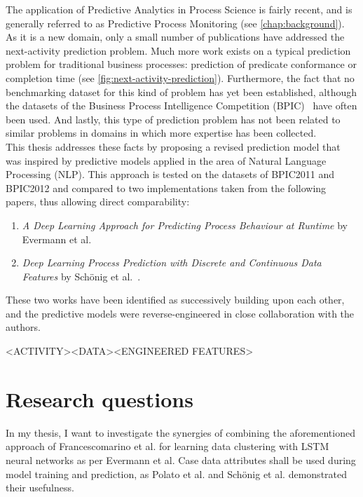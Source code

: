The application of Predictive Analytics in Process Science is fairly recent, and is generally referred to as Predictive Process Monitoring (see \autoref{chap:background}). As it is a new domain, only a small number of publications have addressed the next-activity prediction problem. Much more work exists on a typical prediction problem for traditional business processes: prediction of predicate conformance or completion time (see \autoref{fig:next-activity-prediction}). Furthermore, the fact that no benchmarking dataset for this kind of problem has yet been established, although the datasets of the Business Process Intelligence Competition (BPIC)~\cite{BPIC2011, BPIC2012, BPIC2017} have often been used. And lastly, this type of prediction problem has not been related to similar problems in domains in which more expertise has been collected.\\

This thesis addresses these facts by proposing a revised prediction model that was inspired by predictive models applied in the area of Natural Language Processing (NLP). This approach is tested on the datasets of BPIC2011 and BPIC2012 and compared to two implementations taken from the following papers, thus allowing direct comparability:

\begin{enumerate}
    \item \textit{A Deep Learning Approach for Predicting Process Behaviour at Runtime} by Evermann et al.~\cite{evermann2016} \item\textit{Deep Learning Process Prediction with Discrete and Continuous Data Features} by Schönig et al.~\cite{schoenig2018}.
\end{enumerate}

These two works have been identified as successively building upon each other, and the predictive models were reverse-engineered in close collaboration with the authors.

<ACTIVITY><DATA><ENGINEERED FEATURES>

\section{Research questions}\label{sec:intro:objective}

In my thesis, I want to investigate the synergies of combining the aforementioned approach of Francescomarino et al. for learning data clustering with LSTM neural networks as per Evermann et al. Case data attributes shall be used during model training and prediction, as Polato et al. \cite{polato2014} and Schönig et al. \cite{schoenig2018} demonstrated their usefulness.

